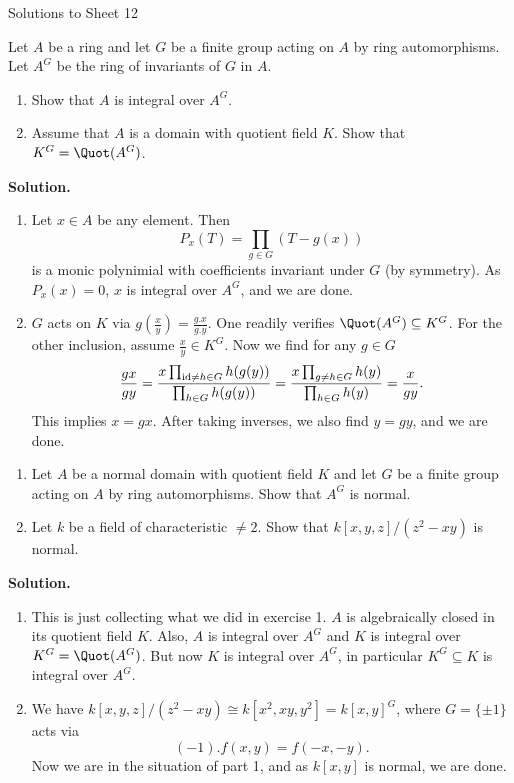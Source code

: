 \documentclass[a4paper,11pt]{article}
\begin{document}
\begin{center}
    \huge{Solutions to Sheet 12}
\end{center}

Let $A$ be a ring and let $G$ be a finite group acting on $A$ by ring automorphisms.
Let $A^G$ be the ring of invariants of $G$ in $A$.
\begin{enumerate}
    \item Show that $A$ is integral over $A^G$.
    \item Assume that $A$ is a domain with quotient field $K$. Show that $K^G = 
        \Quot(A^G)$. 
\end{enumerate}
\textbf{Solution.}
\begin{enumerate}
    \item Let $x \in A$ be any element. Then 
        \begin{equation*}
            P_x(T) = \prod_{g \in G}(T-g(x))
        \end{equation*}
        is a monic polynimial with coefficients invariant under $G$ (by symmetry). 
        As $P_x(x) = 0$, $x$ is integral over $A^G$, and we are done.
    \item $G$ acts on $K$ via $g (\frac xy) = \frac{g.x}{g.y}$. One readily 
        verifies $\Quot(A^G) \subseteq K^G$. For the other inclusion, assume 
        $\frac xy \in K^G$. Now we find for any $g \in G$
        \begin{equation*}
            \frac {gx}{gy} = \frac {x\prod_{\operatorname{id} \neq h \in G} h(g(y))}{\prod_{h
                \in G} h(g(y))} = \frac {x \prod_{g \neq h \in G}
                h(y)}{\prod_{h \in G} h(y)} = \frac{x}{gy}.
        \end{equation*}
        This implies $x = gx$. After taking inverses, we also find 
        $y = gy$, and we are done.
\end{enumerate}

\begin{enumerate}
    \item Let $A$ be a normal domain with quotient field $K$ and let $G$ be a
        finite group acting on $A$ by ring automorphisms. Show that $A^G$ is
        normal.
    \item Let $k$ be a field of characteristic $\neq 2$. Show that
        $k[x,y,z]/(z^2 - xy)$ is normal. 
\end{enumerate}

\textbf{Solution.}
\begin{enumerate}
    \item This is just collecting what we did in exercise 1. $A$ is algebraically
        closed in its quotient field $K$. Also, $A$ is integral over $A^G$ and
        $K$ is integral over $K^G = \Quot(A^G)$. But now $K$ is integral over
        $A^G$, in particular $K^G \subseteq K$ is integral over $A^G$. 

    \item We have $k[x,y,z]/(z^2-xy) \cong k[x^2, xy, y^2] = k[x,y]^G$,
        where $G = \{\pm 1\}$ acts via 
        $$(-1).f(x,y) = f(-x,-y).$$
        Now we are in the situation of part 1, and as $k[x,y]$ is normal, we are 
        done.
\end{enumerate}
\end{document}
